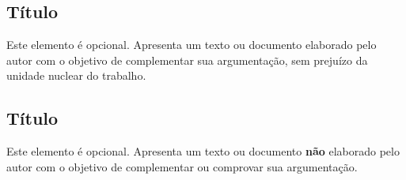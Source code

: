 \documentclass[
        english,			
        brazil			        %
        ,<...>]{abntbibufjf}
\begin{document}

\postextual 









\begin{apendicesenv}

\chapter{T\'itulo}

Este elemento \'e opcional. Apresenta um texto ou documento elaborado pelo autor com o objetivo de complementar sua argumenta\c{c}\~ao, 
sem preju\'izo da unidade nuclear do trabalho.

\end{apendicesenv}


\begin{anexosenv}

\chapter{T\'itulo}


Este elemento \'e opcional. Apresenta um texto ou documento \textbf{n\~ao} elaborado pelo autor com o objetivo de complementar ou comprovar sua 
argumenta\c{c}\~ao. 


\end{anexosenv}

\end{document}
